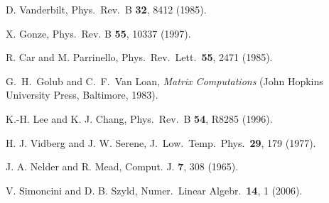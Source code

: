 \documentclass[twocolumn,prb,showpacs,superscriptaddress]{revtex4}
\begin{document}
\begin{thebibliography}{99}
D. Vanderbilt, 
Phys.\ Rev.\ B {\bf 32}, 8412 (1985).

X. Gonze,
Phys.\ Rev. B {\bf 55}, 10337 (1997).

R. Car and M. Parrinello,
Phys.\ Rev.\ Lett.\ {\bf 55}, 2471 (1985). 

G.\ H.\ Golub and C.\ F.\ Van Loan, {\it Matrix Computations} (John Hopkins University Press, Baltimore, 1983).

K.-H. Lee and K. J. Chang,
Phys.\ Rev.\ B {\bf 54}, R8285 (1996).

H. J. Vidberg and J. W. Serene,
J.\ Low.\ Temp.\ Phys.\ {\bf 29}, 179 (1977).

J. A. Nelder and R. Mead,
Comput. J. {\bf 7}, 308 (1965).

V. Simoncini and D. B. Szyld,
Numer.\ Linear Algebr.\ {\bf 14}, 1 (2006).

\end{thebibliography}
\end{document}
